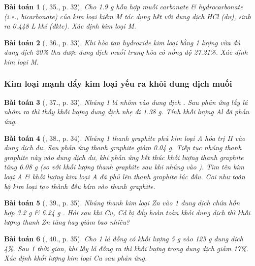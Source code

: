 \documentclass{article}
\newtheorem{baitoan}{Bài toán}
\begin{document}
\begin{baitoan}[\cite{An_350_BT_Hoa_Hoc_9}, 35., p. 32]
	Cho \emph{1.9 g} hỗn hợp muối carbonate \& hydrocarbonate (i.e., bicarbonate) của kim loại kiềm M tác dụng hết với dung dịch \emph{HCl} (dư), sinh ra \emph{0.448 L} khí (đktc). Xác định kim loại M.
\end{baitoan}

\begin{baitoan}[\cite{An_350_BT_Hoa_Hoc_9}, 36., p. 33]
	Khi hòa tan hydroxide kim loại \emph{} bằng 1 lượng vừa đủ dung dịch \emph{ 20\%} thu được dung dịch muối trung hòa có nồng độ \emph{27.21\%}. Xác định kim loại M.
\end{baitoan}

\subsubsection{Kim loại mạnh đẩy kim loại yếu ra khỏi dung dịch muối}

\begin{baitoan}[\cite{An_350_BT_Hoa_Hoc_9}, 37., p. 33]
	Nhúng 1 lá nhôm vào dung dịch \emph{}. Sau phản ứng lấy lá nhôm ra thì thấy khối lượng dung dịch nhẹ đi \emph{1.38 g}. Tính khối lượng \emph{Al} đã phản ứng.
\end{baitoan}

\begin{baitoan}[\cite{An_350_BT_Hoa_Hoc_9}, 38., p. 34]
	Nhúng 1 thanh graphite phủ kim loại A hóa trị II vào dung dịch \emph{} dư. Sau phản ứng thanh graphite giảm \emph{0.04 g}. Tiếp tục nhúng thanh graphite này vào dung dịch \emph{} dư, khi phản ứng kết thúc khối lượng thanh graphite tăng \emph{6.08 g} (so với khối lượng thanh graphite sau khi nhúng vào \emph{}). Tìm tên kim loại A \& khối lượng kim loại A đã phủ lên thanh graphite lúc đầu. Coi như toàn bộ kim loại tạo thành đều bám vào thanh graphite.
\end{baitoan}

\begin{baitoan}[\cite{An_350_BT_Hoa_Hoc_9}, 39., p. 35]
	Nhúng thanh kim loại \emph{Zn} vào 1 dung dịch chứa hỗn hợp \emph{3.2 g } \& \emph{6.24 g }. Hỏi sau khi \emph{Cu, Cd} bị đẩy hoàn toàn khỏi dung dịch thì khối lượng thanh \emph{Zn} tăng hay giảm bao nhiêu?	
\end{baitoan}

\begin{baitoan}[\cite{An_350_BT_Hoa_Hoc_9}, 40., p. 35]
	Cho 1 lá đồng có khối lượng \emph{5 g} vào \emph{125 g} dung dịch \emph{ 4\%}. Sau 1 thời gian, khi lấy lá đồng ra thì khối lượng \emph{} trong dung dịch giảm \emph{17\%}. Xác định khối lượng kim loại \emph{Cu} sau phản ứng.
\end{baitoan}
\end{document}
